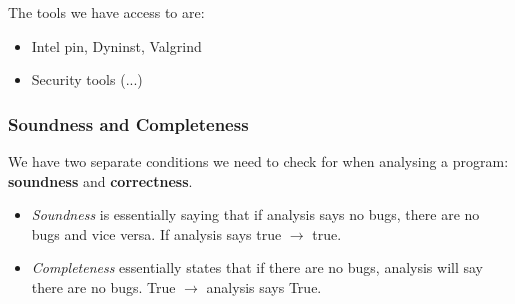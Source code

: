 \documentclass[11pt,a4paper,titlepage,dvipsnames,cmyk]{scrartcl}
\begin{document}
The tools we have access to are:
\begin{itemize}
    \item Intel pin, Dyninst, Valgrind
    \item Security tools (...)
\end{itemize}

\subsubsection{Soundness and Completeness}
We have two separate conditions we need to check for when analysing a program: \textbf{soundness} and \textbf{correctness}.

\begin{itemize}
    \item \textit{Soundness} is essentially saying that if analysis says no bugs, there are no bugs and vice versa. {\color{blue}If analysis says true $\rightarrow$ true}.
    \item \textit{Completeness} essentially states that if there are no bugs, analysis will say there are no bugs. {\color{blue}True $\rightarrow$ analysis says True}.
\end{itemize}
\end{document}
